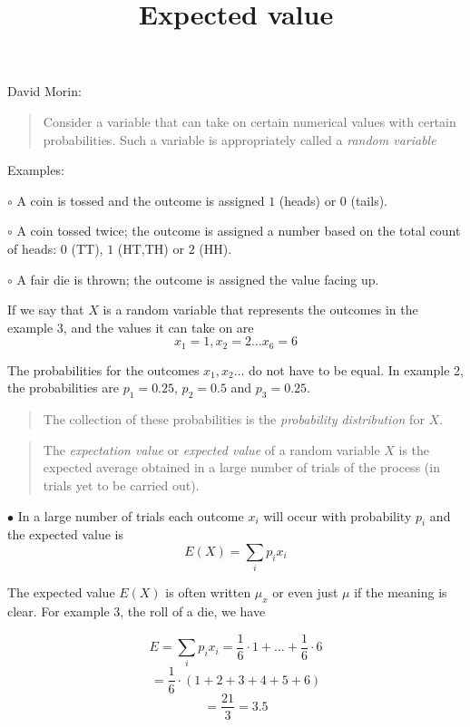 \documentclass[11pt, oneside]{article}
\title{Expected value}
\date{}
\begin{document}
\maketitle
\Large


David Morin:
\begin{quote}\color{blue}Consider a variable that can take on certain numerical values with certain probabilities.  Such a variable is appropriately called a \emph{random variable}\color{black}\end{quote}

Examples:

$\circ$ A coin is tossed and the outcome is assigned $1$ (heads) or $0$ (tails).

$\circ$ A coin tossed twice; the outcome is assigned a number based on the total count of heads:  $0$ (TT), $1$ (HT,TH) or $2$ (HH).

$\circ$ A fair die is thrown;  the outcome is assigned the value facing up.

If we say that $X$ is a random variable that represents the outcomes in the example 3, and the values it can take on are
\[ x_1 = 1, x_2 = 2 \dots x_6 = 6 \]

The probabilities for the outcomes $x_1, x_2 \dots$ do not have to be equal.  In example 2, the probabilities are $p_1 = 0.25$, $p_2 = 0.5$ and $p_3 = 0.25$.

\begin{quote}\color{blue}The collection of these probabilities is the \emph{probability distribution} for $X$.\end{quote}

\begin{quote}The \emph{expectation value} or \emph{expected value} of a random variable $X$ is the expected average obtained in a large number of trials of the process (in trials yet to be carried out).\color{black}\end{quote}

$\bullet$ In a large number of trials each outcome $x_i$ will occur with probability $p_i$ and the expected value is
\[ E(X) = \sum_i p_i x_i  \]

The expected value $E(X)$ is often written $\mu_x$ or even just $\mu$ if the meaning is clear.  For example 3, the roll of a die, we have

\[ E = \sum_i p_i x_i = \frac{1}{6} \cdot 1 + \dots + \frac{1}{6} \cdot 6  \]
\[ = \frac{1}{6} \cdot (1 + 2 + 3 + 4 + 5 + 6 ) \]
\[ = \frac{21}{3} = 3.5 \]
\end{document}
